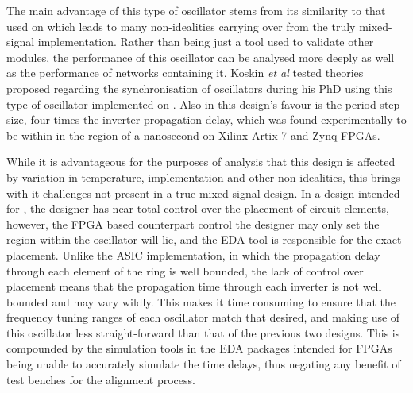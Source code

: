 The main advantage of this type of oscillator stems from its similarity to that used on  which leads to many non-idealities carrying over from the truly mixed-signal implementation. Rather than being just a tool used to validate other modules, the performance of this oscillator can be analysed more deeply as well as the performance of networks containing it. Koskin \textit{et al} tested theories proposed regarding the synchronisation of oscillators during his PhD using this type of oscillator implemented on  \cite{koskin2019phd,theboys2019}. Also in this design's favour is the period step size, four times the inverter propagation delay, which was found experimentally to be within in the region of a nanosecond on Xilinx Artix-7 and Zynq \acp{FPGA}.

While it is advantageous for the purposes of analysis that this design is affected by variation in temperature, implementation and other non-idealities, this brings with it challenges not present in a true mixed-signal design. In a design intended for , the designer has near total control over the placement of circuit elements, however, the \ac{FPGA} based counterpart control the designer may only set the region within the oscillator will lie, and the \acs{EDA} tool is responsible for the exact placement. Unlike the \ac{ASIC} implementation, in which the propagation delay through each element of the ring is well bounded, the lack of control over placement means that the propagation time through each inverter is not well bounded and may vary wildly. This makes it time consuming to ensure that the frequency tuning ranges of each oscillator match that desired, and making use of this oscillator less straight-forward than that of the previous two designs. This is compounded by the simulation tools in the \ac{EDA} packages intended for \acp{FPGA} being unable to accurately simulate the time delays, thus negating any benefit of test benches for the alignment process.

